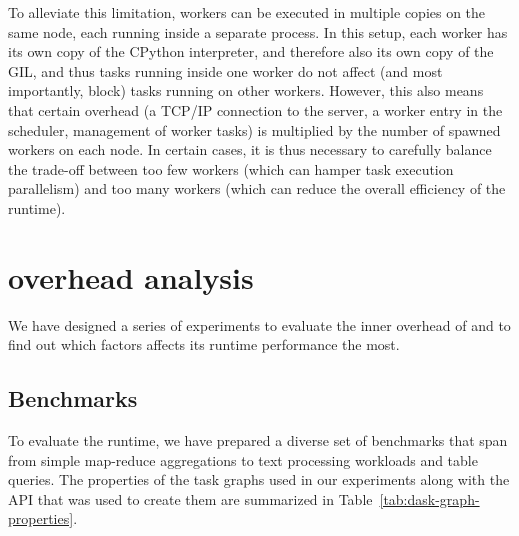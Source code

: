 To alleviate this limitation, \dask{} workers can be executed in multiple copies on
the same node, each running inside a separate process. In this setup, each worker has its own copy
of the CPython interpreter, and therefore also its own copy of the GIL, and thus tasks running
inside one worker do not affect (and most importantly, block) tasks running on other workers.
However, this also means that certain overhead (a TCP/IP connection to the server, a worker entry
in the scheduler, management of worker tasks) is multiplied by the number of spawned workers on
each node. In certain cases, it is thus necessary to carefully balance the trade-off between too
few workers (which can hamper task execution parallelism) and too many workers (which can reduce
the overall efficiency of the \dask{} runtime).

\section{\dask{} overhead analysis}
\label{sec:rsds-dask-overhead-analysis}
We have designed a series of experiments to evaluate the inner overhead of \dask{}
and to find out which factors affects its runtime performance the most.

\subsection*{Benchmarks}
To evaluate the runtime, we have prepared a diverse set of benchmarks that span from simple
map-reduce aggregations to text processing workloads and table queries. The properties of the task
graphs used in our experiments along with the \dask{} API that was used to create
them are summarized in Table~\ref{tab:dask-graph-properties}.

